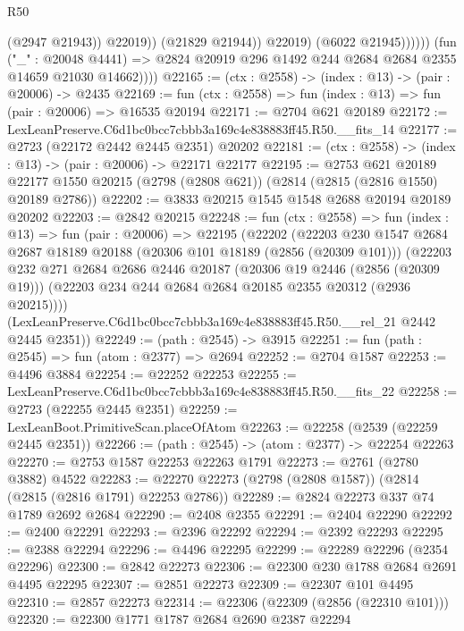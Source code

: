 \begin{lexlean}{R50}
\begin{coremodule}
                              (@2947 @21943))
                            @22019))
                        (@21829 @21944))
                      @22019)
                    (@6022 @21945))))))
          (fun ("_" : @20048 @4441) =>
          @2824 @20919 @296 @1492 @244 @2684 @2684 @2355 @14659 @21030 @14662))))
@22165 := (ctx : @2558) -> (index : @13) -> (pair : @20006) -> @2435
@22169 := fun (ctx : @2558) => fun (index : @13) => fun (pair : @20006) => @16535 @20194
@22171 := @2704 @621 @20189
@22172 := LexLeanPreserve.C6d1bc0bcc7cbbb3a169c4e838883ff45.R50.__fits_14
@22177 := @2723 (@22172 @2442 @2445 @2351) @20202
@22181 := (ctx : @2558) -> (index : @13) -> (pair : @20006) -> @22171 @22177
@22195 := @2753
    @621
    @20189
    @22177
    @1550
    @20215
    (@2798 (@2808 @621))
    (@2814 (@2815 (@2816 @1550) @20189 @2786))
@22202 := @3833 @20215 @1545 @1548 @2688 @20194 @20189 @20202
@22203 := @2842 @20215
@22248 := fun (ctx : @2558) =>
  fun (index : @13) =>
  fun (pair : @20006) =>
  @22195
    (@22202
      (@22203
        @230
        @1547
        @2684
        @2687
        @18189
        @20188
        (@20306 @101 @18189 (@2856 (@20309 @101)))
        (@22203
          @232
          @271
          @2684
          @2686
          @2446
          @20187
          (@20306 @19 @2446 (@2856 (@20309 @19)))
          (@22203 @234 @244 @2684 @2684 @20185 @2355 @20312 (@2936 @20215))))
      (LexLeanPreserve.C6d1bc0bcc7cbbb3a169c4e838883ff45.R50.__rel_21 @2442 @2445 @2351))
@22249 := (path : @2545) -> @3915
@22251 := fun (path : @2545) => fun (atom : @2377) => @2694
@22252 := @2704 @1587
@22253 := @4496 @3884
@22254 := @22252 @22253
@22255 := LexLeanPreserve.C6d1bc0bcc7cbbb3a169c4e838883ff45.R50.__fits_22
@22258 := @2723 (@22255 @2445 @2351)
@22259 := LexLeanBoot.PrimitiveScan.placeOfAtom
@22263 := @22258 (@2539 (@22259 @2445 @2351))
@22266 := (path : @2545) -> (atom : @2377) -> @22254 @22263
@22270 := @2753 @1587 @22253 @22263 @1791
@22273 := @2761 (@2780 @3882) @4522
@22283 := @22270 @22273 (@2798 (@2808 @1587)) (@2814 (@2815 (@2816 @1791) @22253 @2786))
@22289 := @2824 @22273 @337 @74 @1789 @2692 @2684
@22290 := @2408 @2355
@22291 := @2404 @22290
@22292 := @2400 @22291
@22293 := @2396 @22292
@22294 := @2392 @22293
@22295 := @2388 @22294
@22296 := @4496 @22295
@22299 := @22289 @22296 (@2354 @22296)
@22300 := @2842 @22273
@22306 := @22300 @230 @1788 @2684 @2691 @4495 @22295
@22307 := @2851 @22273
@22309 := @22307 @101 @4495
@22310 := @2857 @22273
@22314 := @22306 (@22309 (@2856 (@22310 @101)))
@22320 := @22300 @1771 @1787 @2684 @2690 @2387 @22294

\end{coremodule}
\end{lexlean}
